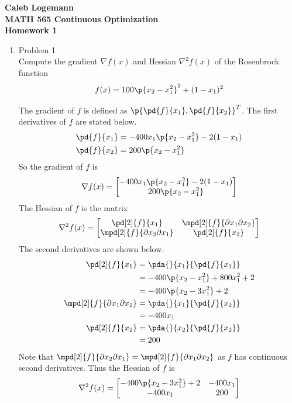 \documentclass[11pt, oneside]{article}
\begin{document}
\noindent \textbf{\Large{Caleb Logemann \\
MATH 565 Continuous Optimization \\
Homework 1
}}

%
\begin{enumerate}
  \item %
    Problem 1 \\
    Compute the gradient $\nabla f(x)$ and Hessian $\nabla^2 f(x)$ of the
    Rosenbrock function
    \[
      f(x) = 100\p{x_2 - x_1^2}^2 + (1 - x_1)^2
    \]

    The gradient of $f$ is defined as $\p{\pd{f}{x_1}, \pd{f}{x_2}}^T$.
    The first derivatives of $f$ are stated below.
    \begin{align*}
      \pd{f}{x_1} &= -400 x_1 \p{x_2 - x_1^2} - 2(1 - x_1) \\
      \pd{f}{x_2} &= 200\p{x_2 - x_1^2}
    \end{align*}
    So the gradient of $f$ is 
    \[
      \nabla f(x) =
      \begin{bmatrix}
        -400 x_1 \p{x_2 - x_1^2} - 2(1 - x_1) \\
        200\p{x_2 - x_1^2}
      \end{bmatrix}
    \]
    The Hessian of $f$ is the matrix
    \[
      \nabla^2 f(x) =
      \begin{bmatrix}
        \pd[2]{f}{x_1} & \mpd[2]{f}{\partial x_1 \partial x_2} \\
        \mpd[2]{f}{\partial x_2 \partial x_1} & \pd[2]{f}{x_2}
      \end{bmatrix}
    \]
    The second derivatives are shown below.
    \begin{align*}
      \pd[2]{f}{x_1} &= \pda{}{x_1}{\pd{f}{x_1}} \\
      &= -400\p{x_2 - x_1^2} + 800 x_1^2 + 2 \\
      &= -400\p{x_2 - 3x_1^2} + 2 \\
      \mpd[2]{f}{\partial x_1 \partial x_2} &= \pda{}{x_1}{\pd{f}{x_2}} \\
      &= -400 x_1 \\
      \pd[2]{f}{x_2} &= \pda{}{x_2}{\pd{f}{x_2}} \\
      &= 200
    \end{align*}
    Note that $\mpd[2]{f}{\partial x_2 \partial x_1} = \mpd[2]{f}{\partial x_1 \partial x_2}$
    as $f$ has continuous second derivatives.
    Thus the Hessian of $f$ is 
    \[
      \nabla^2 f(x) =
      \begin{bmatrix}
         -400\p{x_2 - 3x_1^2} + 2 & -400x_1 \\
        -400x_1 & 200
      \end{bmatrix}
    \]


\end{enumerate}
\end{document}
